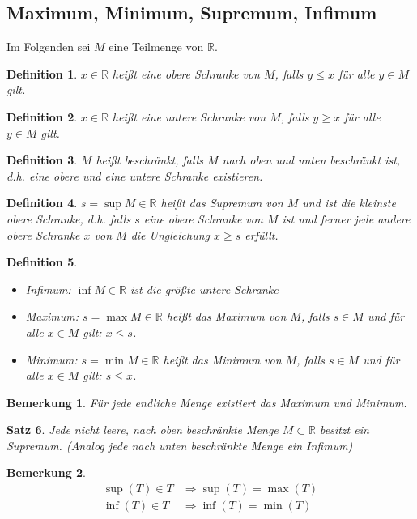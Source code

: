 \documentclass[12pt,a4paper]{article}%
\newtheorem{satz}{Satz}[section]
\newtheorem{definition}[satz]{Definition}
\newtheorem{bem}{Bemerkung}[section]
\numberwithin{equation}{section}
\newcommand{\R}{\mathbb{R}} %
\numberwithin{equation}{subsection}
\begin{document}
	\subsection{Maximum, Minimum, Supremum, Infimum}
	Im Folgenden sei $M$ eine Teilmenge von $\R$.
	\begin{definition}
	  $x \in \R$ heißt eine obere Schranke von $M$, falls $y \leq x$ für alle $y \in M$ gilt. 
	\end{definition}
	\begin{definition}
	  $x \in \R$ heißt eine untere Schranke von $M$, falls $y \geq x$ für alle $y \in M$ gilt. 
	\end{definition}
	\begin{definition}
	  $M$ heißt beschränkt, falls $M$ nach oben und unten beschränkt ist, d.h. eine obere und eine untere Schranke existieren.
	\end{definition}
	\begin{definition}
	  $s = \sup M \in \R$ heißt das Supremum von $M$ und ist die kleinste obere Schranke, d.h. falls $s$ eine obere Schranke von $M$ ist und ferner jede andere obere Schranke $x$ von $M$ die Ungleichung $x\geq s$ erfüllt.
	\end{definition}
	\begin{definition}$\;$\newline
    \vspace{-0.7cm}
	  \begin{itemize}
	    \item[] Infimum: $\inf M \in \R$ ist die größte untere Schranke
	    \item[] Maximum: $s = \max M \in \R$ heißt das Maximum von $M$, falls $s \in M$ und für alle $x \in M$ gilt: $x\leq s$.
	    \item[] Minimum: $s = \min M \in \R$ heißt das Minimum von $M$, falls $s \in M$ und für alle $x \in M$ gilt: $s \leq x$.
	  \end{itemize}
	\end{definition}
	\begin{bem}
	  Für jede endliche Menge existiert das Maximum und Minimum.
	\end{bem}
	\begin{satz}
	  Jede nicht leere, nach oben beschränkte Menge $M \subset \R$ besitzt ein Supremum. (Analog jede nach unten beschränkte Menge ein Infimum)
	\end{satz}
	\begin{bem}
	  \begin{align}
	    \sup(T) \in T &\Rightarrow \sup(T) = \max(T) \\
	    \inf(T) \in T &\Rightarrow \inf(T) = \min(T)
	  \end{align}
	\end{bem}
\end{document}
